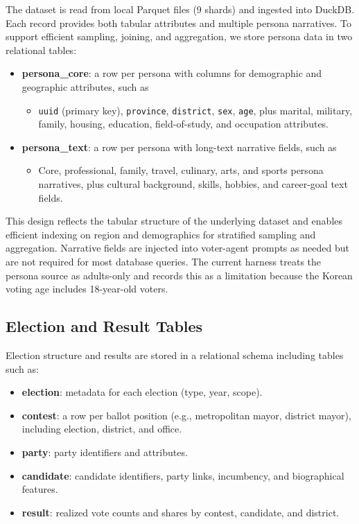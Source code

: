 \documentclass[11pt]{article}
\begin{document}
The dataset is read from local Parquet files (9 shards) and ingested into DuckDB. Each record provides both tabular attributes and multiple persona narratives. To support efficient sampling, joining, and aggregation, we store persona data in two relational tables:

\begin{itemize}
  \item \textbf{persona\_core}: a row per persona with columns for demographic and geographic attributes, such as
  \begin{itemize}
    \item \texttt{uuid} (primary key), \texttt{province}, \texttt{district}, \texttt{sex}, \texttt{age}, plus marital, military, family, housing, education, field-of-study, and occupation attributes.
  \end{itemize}
  \item \textbf{persona\_text}: a row per persona with long-text narrative fields, such as
  \begin{itemize}
    \item Core, professional, family, travel, culinary, arts, and sports persona narratives, plus cultural background, skills, hobbies, and career-goal text fields.
  \end{itemize}
\end{itemize}

This design reflects the tabular structure of the underlying dataset and enables efficient indexing on region and demographics for stratified sampling and aggregation. Narrative fields are injected into voter-agent prompts as needed but are not required for most database queries. The current harness treats the persona source as adults-only and records this as a limitation because the Korean voting age includes 18-year-old voters.

\subsection{Election and Result Tables}

Election structure and results are stored in a relational schema including tables such as:

\begin{itemize}
  \item \textbf{election}: metadata for each election (type, year, scope).
  \item \textbf{contest}: a row per ballot position (e.g., metropolitan mayor, district mayor), including election, district, and office.
  \item \textbf{party}: party identifiers and attributes.
  \item \textbf{candidate}: candidate identifiers, party links, incumbency, and biographical features.
  \item \textbf{result}: realized vote counts and shares by contest, candidate, and district.
\end{itemize}
\end{document}
